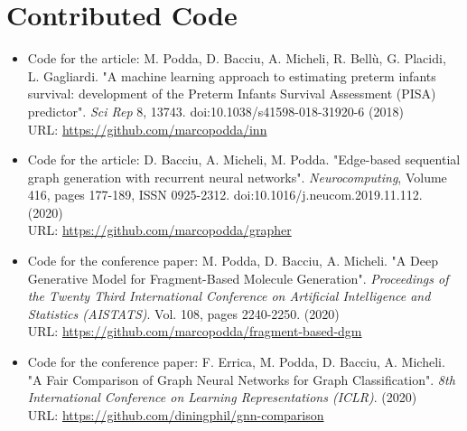 \chapter{Contributed Code}\label{AppendixC}

\begin{itemize}
    \item Code for the article: M. Podda, D. Bacciu, A. Micheli, R. Bellù, G. Placidi, L. Gagliardi. "A machine learning approach to estimating preterm infants survival: development of the Preterm Infants Survival Assessment (PISA) predictor". \textit{Sci Rep} 8, 13743. doi:10.1038/s41598-018-31920-6 (2018)\\
    URL: \url{https://github.com/marcopodda/inn}
    \item Code for the article: D. Bacciu, A. Micheli, M. Podda. "Edge-based sequential graph generation with recurrent neural networks". \textit{Neurocomputing},
    Volume 416, pages 177-189, ISSN 0925-2312. doi:10.1016/j.neucom.2019.11.112. (2020)\\
    URL: \url{https://github.com/marcopodda/grapher}
    \item Code for the conference paper: M. Podda, D. Bacciu, A. Micheli. "A Deep Generative Model for Fragment-Based Molecule Generation". \textit{Proceedings of the Twenty Third International Conference on Artificial Intelligence and Statistics (AISTATS)}. Vol. 108, pages 2240-2250. (2020)\\
    URL: \url{https://github.com/marcopodda/fragment-based-dgm}
    \item Code for the conference paper: F. Errica, M. Podda, D. Bacciu, A. Micheli. "A Fair Comparison of Graph Neural Networks for Graph Classification".
    \textit{8th International Conference on Learning Representations (ICLR)}. (2020)\\
    URL: \url{https://github.com/diningphil/gnn-comparison}
\end{itemize}